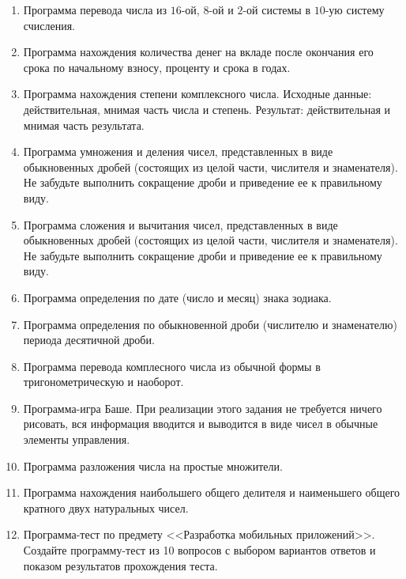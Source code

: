 \begin{enumerate}
  
 \item
 Программа перевода числа из $16$-ой, $8$-ой и $2$-ой системы в $10$-ую систему счисления.
 
 
 \item
 Программа нахождения количества денег на вкладе после окончания его срока по начальному взносу, проценту и срока в годах.
 
 
 \item
 Программа нахождения степени комплексного числа. Исходные данные: действительная, мнимая часть числа и степень. 
 Результат: действительная и мнимая часть результата.
 
 
 \item
 Программа умножения и деления чисел, представленных в виде обыкновенных дробей (состоящих из целой части, числителя и 
 знаменателя). Не забудьте выполнить сокращение дроби и приведение ее к правильному виду.

  \item
 Программа сложения и вычитания чисел, представленных в виде обыкновенных дробей (состоящих из целой части, числителя и 
 знаменателя). Не забудьте выполнить сокращение дроби и приведение ее к правильному виду.

 

 \item
 Программа определения по дате (число и месяц) знака зодиака.
 
 \item
Программа определения по обыкновенной дроби (числителю и знаменателю) периода десятичной дроби.
 
 \item
 Программа перевода комплесного числа из обычной формы в тригонометрическую и наоборот.

 
 \item
 Программа-игра Баше. При реализации этого задания не требуется ничего рисовать, вся информация вводится и выводится в виде
 чисел в обычные элементы управления.
 
 \item
 Программа разложения числа на простые множители.
 
 \item
 Программа нахождения наибольшего общего делителя и наименьшего общего кратного двух натуральных чисел.
 
 
 \item Программа-тест по предмету <<Разработка мобильных приложений>>. Создайте программу-тест из 10 вопросов с выбором
вариантов ответов и показом результатов прохождения теста.
\end{enumerate}

